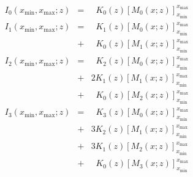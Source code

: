 \documentclass[a4paper,10pt,twosided]{article}
\begin{document}
\begin{eqnarray*}
     I_0(x_\mathrm{min},x_\mathrm{max};z) &=&  \;\; K_0(z) \left[ M_0(x;z) \right]_{x_\mathrm{min}}^{x_\mathrm{max}}
\\   I_1(x_\mathrm{min},x_\mathrm{max};z) &=&  \;\; K_1(z) \left[ M_0(x;z) \right]_{x_\mathrm{min}}^{x_\mathrm{max}}
                                        \\  &+&\;\; K_0(z) \left[ M_1(x;z) \right]_{x_\mathrm{min}}^{x_\mathrm{max}}
\\   I_2(x_\mathrm{min},x_\mathrm{max};z) &=&  \;\; K_2(z) \left[ M_0(x;z) \right]_{x_\mathrm{min}}^{x_\mathrm{max}}
                                        \\ &+&  2 K_1(z) \left[ M_1(x;z) \right]_{x_\mathrm{min}}^{x_\mathrm{max}}
                                        \\ &+& \;\; K_0(z) \left[ M_2(x;z) \right]_{x_\mathrm{min}}^{x_\mathrm{max}}
\\   I_3(x_\mathrm{min},x_\mathrm{max};z) &=&  \;\; K_3(z) \left[ M_0(x;z) \right]_{x_\mathrm{min}}^{x_\mathrm{max}}
                                        \\ &+&  3 K_2(z) \left[ M_1(x;z) \right]_{x_\mathrm{min}}^{x_\mathrm{max}}
                                        \\ &+&  3 K_1(z) \left[ M_2(x;z) \right]_{x_\mathrm{min}}^{x_\mathrm{max}}
                                        \\ &+& \;\; K_0(z) \left[ M_3(x;z) \right]_{x_\mathrm{min}}^{x_\mathrm{max}}
\end{eqnarray*}
\end{document}
